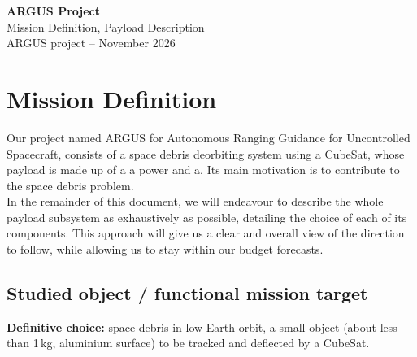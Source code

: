 \documentclass[11pt,a4paper]{article}
\begin{document}
\begin{center}
{\Large \textbf{ARGUS Project}}\\[0.3em]
{\large Mission Definition, Payload Description}\\[0.5em]
ARGUS project -- November 2026
\end{center}

\small
\tableofcontents
\normalsize

\section{Mission Definition}
Our project named ARGUS for Autonomous Ranging Guidance for Uncontrolled Spacecraft, consists of a space debris deorbiting system using a  CubeSat, whose payload is made up of a  a power   and a. Its main motivation is to contribute to the space debris problem.\\
In the remainder of this document, we will endeavour to describe the whole payload  subsystem as exhaustively as possible, detailing the choice of each of its components. This approach will give us a clear and overall view of the direction to follow, while allowing us to stay within our budget forecasts.

\subsection{Studied object / functional mission target}
\textbf{Definitive choice:} space debris in low Earth orbit, a small object (about  less than 1\,kg, aluminium surface) to be tracked and deflected by a CubeSat.\\

\end{document}
